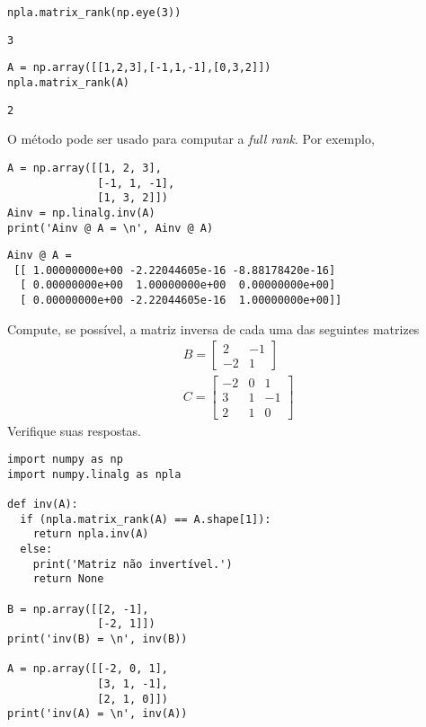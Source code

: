 \begin{lstlisting}
npla.matrix_rank(np.eye(3))
\end{lstlisting}

\begin{verbatim}
3
\end{verbatim}

\begin{lstlisting}
A = np.array([[1,2,3],[-1,1,-1],[0,3,2]])
npla.matrix_rank(A)
\end{lstlisting}

\begin{verbatim}
2
\end{verbatim}


O método \hl{\PYTHONnumpyDOTlinalgDOTinv} pode ser usado para computar a  \textit{full rank}. Por exemplo,

\begin{lstlisting}
A = np.array([[1, 2, 3],
              [-1, 1, -1],
              [1, 3, 2]])
Ainv = np.linalg.inv(A)
print('Ainv @ A = \n', Ainv @ A)
\end{lstlisting}


\begin{verbatim}
Ainv @ A = 
 [[ 1.00000000e+00 -2.22044605e-16 -8.88178420e-16]
  [ 0.00000000e+00  1.00000000e+00  0.00000000e+00]
  [ 0.00000000e+00 -2.22044605e-16  1.00000000e+00]]
\end{verbatim}

\begin{exer}
  Compute, se possível, a matriz inversa de cada uma das seguintes matrizes
  \begin{align}
    & B =
    \begin{bmatrix}
      2 & -1\\
      -2 & 1
    \end{bmatrix}\\
    & C =
    \begin{bmatrix}
      -2 & 0 & 1\\
      3 & 1 & -1\\
      2 & 1 & 0
    \end{bmatrix}
  \end{align}
  Verifique suas respostas.
\end{exer}
\begin{resp}
  
\begin{lstlisting}
import numpy as np
import numpy.linalg as npla

def inv(A):
  if (npla.matrix_rank(A) == A.shape[1]):
    return npla.inv(A)
  else:
    print('Matriz não invertível.')
    return None

B = np.array([[2, -1],
              [-2, 1]])
print('inv(B) = \n', inv(B))

A = np.array([[-2, 0, 1],
              [3, 1, -1],
              [2, 1, 0]])
print('inv(A) = \n', inv(A))  
\end{lstlisting}

\end{resp}


